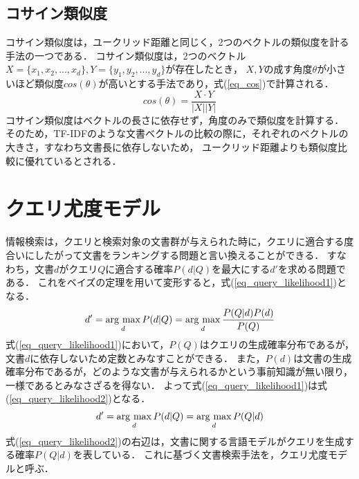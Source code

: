 \subsection{コサイン類似度} \label{sec_cosine}
コサイン類似度は，ユークリッド距離と同じく，2つのベクトルの類似度を計る手法の一つである．
コサイン類似度は，2つのベクトル$X = \{x_1, x_2, ..., x_d\}, Y = \{y_1, y_2, ..., y_d\}$が存在したとき，
$X, Y$の成す角度$\theta$が小さいほど類似度$cos(\theta)$が高いとする手法であり，式(\ref{eq_cos})で計算される．
\begin{equation}
    cos(\theta) = \frac{X \cdot Y}{|X||Y|}  \label{eq_cos}
\end{equation}
コサイン類似度はベクトルの長さに依存せず，角度のみで類似度を計算する．
そのため，TF-IDFのような文書ベクトルの比較の際に，それぞれのベクトルの大きさ，すなわち文書長に依存しないため，
ユークリッド距離よりも類似度比較に優れているとされる．


\section{クエリ尤度モデル}
情報検索は，クエリと検索対象の文書群が与えられた時に，クエリに適合する度合いにしたがって文書をランキングする問題と言い換えることができる．
すなわち，文書$d$がクエリ$Q$に適合する確率$P(d|Q)$を最大にする$d'$を求める問題である．
これをベイズの定理を用いて変形すると，式(\ref{eq_query_likelihood1})となる．
\begin{equation}
    d' = \mathop{\rm arg~max}\limits_{d} P(d|Q) = \mathop{\rm arg~max}\limits_{d} \frac{P(Q|d)P(d)}{P(Q)}    \label{eq_query_likelihood1}
\end{equation}
式(\ref{eq_query_likelihood1})において，$P(Q)$はクエリの生成確率分布であるが，文書$d$に依存しないため定数とみなすことができる．
また，$P(d)$は文書の生成確率分布であるが，どのような文書が与えられるかという事前知識が無い限り，一様であるとみなさざるを得ない．
よって式(\ref{eq_query_likelihood1})は式(\ref{eq_query_likelihood2})となる．
\begin{equation}
    d' = \mathop{\rm arg~max}\limits_{d} P(d|Q) = \mathop{\rm arg~max}\limits_{d} P(Q|d) \label{eq_query_likelihood2}
\end{equation}
式(\ref{eq_query_likelihood2})の右辺は，文書に関する言語モデルがクエリを生成する確率$P(Q|d)$を表している．
これに基づく文書検索手法を，クエリ尤度モデルと呼ぶ．

